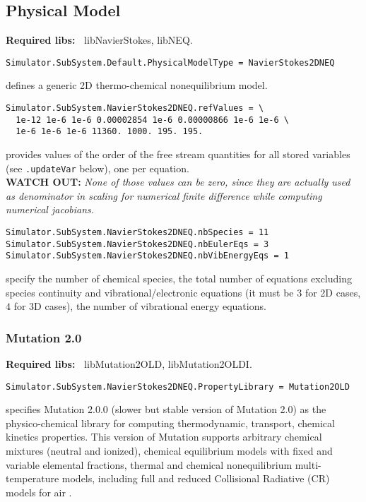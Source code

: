 \documentclass[11pt]{article}
\begin{document}
\subsection{Physical Model}

{\bf Required libs:~} libNavierStokes, libNEQ.

\begin{verbatim}
Simulator.SubSystem.Default.PhysicalModelType = NavierStokes2DNEQ
\end{verbatim}
defines a generic 2D thermo-chemical nonequilibrium model.

\begin{verbatim}
Simulator.SubSystem.NavierStokes2DNEQ.refValues = \
  1e-12 1e-6 1e-6 0.00002854 1e-6 0.00000866 1e-6 1e-6 \
  1e-6 1e-6 1e-6 11360. 1000. 195. 195.
\end{verbatim}
provides values of the order of the free stream quantities for all stored variables (see {\tt .updateVar} below), one per equation. \\
{\bf WATCH OUT:} {\it None of those values can be zero, since they are actually used 
  as denominator in scaling for numerical finite difference while computing numerical jacobians. } 

\begin{verbatim}
Simulator.SubSystem.NavierStokes2DNEQ.nbSpecies = 11
Simulator.SubSystem.NavierStokes2DNEQ.nbEulerEqs = 3
Simulator.SubSystem.NavierStokes2DNEQ.nbVibEnergyEqs = 1
\end{verbatim}
specify the number of chemical species, the total number of equations excluding species continuity and vibrational/electronic equations 
(it must be $3$ for 2D cases, $4$ for 3D cases), the number of vibrational energy equations.

\subsubsection{Mutation 2.0}

{\bf Required libs:~} libMutation2OLD, libMutation2OLDI.

\begin{verbatim}
Simulator.SubSystem.NavierStokes2DNEQ.PropertyLibrary = Mutation2OLD
\end{verbatim}
specifies Mutation 2.0.0 (slower but stable version of Mutation 2.0) \cite{phd:magin, phd:panesi} as 
the physico-chemical library for computing thermodynamic, transport, chemical kinetics properties. This version of 
Mutation supports arbitrary chemical mixtures (neutral and ionized), chemical equilibrium models 
with fixed and variable elemental fractions, thermal and chemical nonequilibrium multi-temperature models, 
including full and reduced Collisional Radiative (CR) models for air \cite{panesi09}. 
\end{document}

